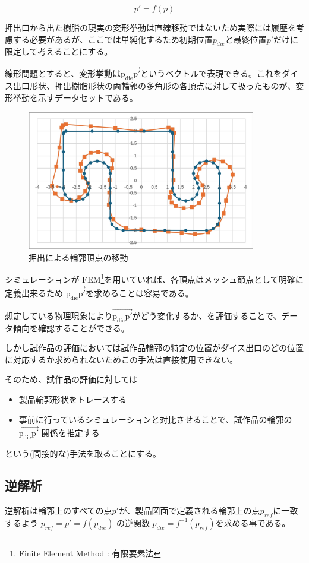 \documentclass[report]{jlreq}
\begin{document}
\[p' = f(p)\]

押出口から出た樹脂の現実の変形挙動は直線移動ではないため実際には履歴を考慮する必要があるが、ここでは単純化するため初期位置$p_{die}$と最終位置$p'$だけに限定して考えることにする。

線形問題とすると、変形挙動は$\overrightarrow{\mathrm{p_{die} p'}}$というベクトルで表現できる。これをダイス出口形状、押出樹脂形状の両輪郭の多角形の各頂点に対して扱ったものが、変形挙動を示すデータセットである。

\begin{figure}
  \centering
  \includegraphics[width=10cm]{extrude.jpg}
  \caption{押出による輪郭頂点の移動}
  \label{fig:extrude} 
\end{figure} 

\newpage


シミュレーションが FEM\footnote{Finite Element Method : 有限要素法 }を用いていれば、各頂点はメッシュ節点として明確に定義出来るため $\overrightarrow{\mathrm{p_{die} p'}}$を求めることは容易である。

想定している物理現象により$\overrightarrow{\mathrm{p_{die} p'}}$がどう変化するか、を評価することで、データ傾向を確認することができる。

しかし試作品の評価においては試作品輪郭の特定の位置がダイス出口のどの位置に対応するか求められないためこの手法は直接使用できない。

そのため、試作品の評価に対しては

\begin{itemize}
  \item 製品輪郭形状をトレースする
  \item 事前に行っているシミュレーションと対比させることで、試作品の輪郭の $\overrightarrow{\mathrm{p_{die} p'}}$ 関係を推定する
\end{itemize}

という({\small 間接的な})手法を取ることにする。

\subsection{逆解析}
逆解析は輪郭上のすべての点$p'$が、製品図面で定義される輪郭上の点$p_{ref}$に一致するよう $p_{ref} = p' = f(p_{die})$ の逆関数 $p_{die} = f^{-1}(p_{ref})$を求める事である。
\end{document}
